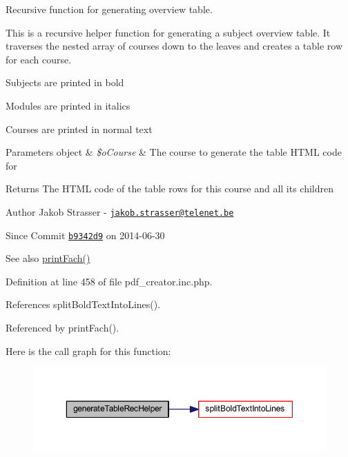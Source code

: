 Recursive function for generating overview table. 

This is a recursive helper function for generating a subject overview table. It traverses the nested array of courses down to the leaves and creates a table row for each course.
\begin{DoxyItemize}
\item Subjects are printed in bold
\item Modules are printed in italics
\item Courses are printed in normal text
\end{DoxyItemize}


\begin{DoxyParams}[1]{Parameters}
object & {\em \$o\+Course} & The course to generate the table H\+T\+M\+L code for \\
\hline
\end{DoxyParams}
\begin{DoxyReturn}{Returns}
The H\+T\+M\+L code of the table rows for this course and all its children
\end{DoxyReturn}
\begin{DoxyAuthor}{Author}
Jakob Strasser -\/ \href{mailto:jakob.strasser@telenet.be}{\tt jakob.\+strasser@telenet.\+be} 
\end{DoxyAuthor}
\begin{DoxySince}{Since}
Commit \href{http://github.com/TheJake123/DrupalModul/commit/b9342d941b3f93e212f3f6af0823a07524dd5954}{\tt b9342d9} on 2014-\/06-\/30
\end{DoxySince}
\begin{DoxySeeAlso}{See also}
\hyperlink{classoverview_p_d_f_abf0674d88080affc25c472fbd0525896}{print\+Fach()} 
\end{DoxySeeAlso}


Definition at line 458 of file pdf\+\_\+creator.\+inc.\+php.



References split\+Bold\+Text\+Into\+Lines().



Referenced by print\+Fach().



Here is the call graph for this function\+:
\nopagebreak
\begin{figure}[H]
\begin{center}
\leavevmode
\includegraphics[width=350pt]{classoverview_p_d_f_ad0ea6c6476d690b08161300e40926dc6_cgraph}
\end{center}
\end{figure}




